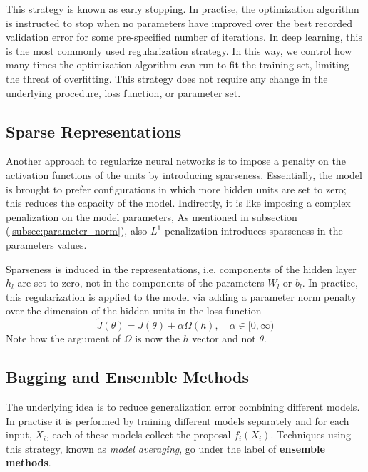 This strategy is known as early stopping. In practise, the optimization algorithm is instructed to stop when no parameters have improved over the best recorded validation error for some pre-specified number of iterations. In deep learning, this is the most commonly used regularization strategy. In this way, we control how many times the optimization algorithm can run to fit the training set, limiting the threat of overfitting. This strategy does not require any change in the underlying procedure, loss function, or parameter set.



\subsection{Sparse Representations}
Another approach to regularize neural networks is to impose a penalty on the activation functions of the units by introducing sparseness. Essentially, the model is brought to prefer configurations in which more hidden units are set to zero; this reduces the capacity of the model. Indirectly, it is like imposing a complex penalization on the model parameters, As mentioned in subsection (\cref{subsec:parameter_norm}), also $L^1$-penalization introduces sparseness in the parameters values. 

Sparseness is induced in the representations, i.e. components of the hidden layer $h_l$ are set to zero, not in the components of the parameters $W_l$ or $b_l$. In practice, this regularization is applied to the model via adding a parameter norm penalty over the dimension of the hidden units in the loss function
\begin{equation*}
    \tilde{J}(\theta) = J(\theta) + \alpha \Omega(h), \quad \alpha \in [0,\infty)
\end{equation*}
Note how the argument of $\Omega$ is now the $h$ vector and not $\theta$.



\subsection{Bagging and Ensemble Methods}\label{subsec:bagging}
The underlying idea is to reduce generalization error combining different models. In practise it is performed by training different models separately and for each input, $X_i$, each of these models collect the proposal $f_i(X_i)$. Techniques using this strategy, known as \textit{model averaging}, go under the label of \textbf{ensemble methods}.

